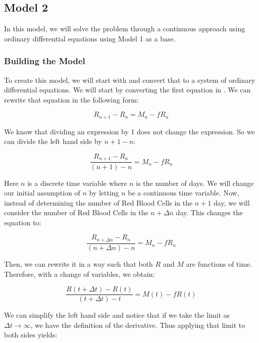 \subsection{Model 2}
\label{subsec:model-2}

In this model, we will solve the problem through a continuous approach using ordinary differential equations using Model 1 as a base.

\subsubsection{Building the Model}

To create this model, we will start with  and convert that to a system of ordinary differential equations. We will start by converting the first equation in . We can rewrite that equation in the following form:

\begin{equation*}
    R_{n+1} - R_n = M_n - fR_n
\end{equation*}

We know that dividing an expression by 1 does not change the expression. So we can divide the left hand side by $n+1-n$:

\begin{equation*}
    \frac{R_{n+1} - R_n}{(n+1)-n} = M_n - fR_n
\end{equation*}

Here $n$ is a discrete time variable where $n$ is the number of days. We will change our initial assumption of $n$ by letting $n$ be a continuous time variable. Now, instead of determining the number of Red Blood Cells in the $n+1$ day, we will consider the number of Red Blood Cells in the $n+\Delta n$ day. This changes the equation to:

\begin{equation*}
    \frac{R_{n+\Delta n} - R_n}{(n+\Delta n)-n} = M_n - fR_n
\end{equation*}

Then, we can rewrite it in a way such that both $R$ and $M$ are functions of time. Therefore, with a change of variables, we obtain:

\begin{equation*}
    \frac{R(t+\Delta t) - R(t)}{(t+\Delta t)-t} = M(t) - fR(t)
\end{equation*}

We can simplify the left hand side and notice that if we take the limit as $\Delta t\to\infty$, we have the definition of the derivative. Thus applying that limit to both sides yields:

